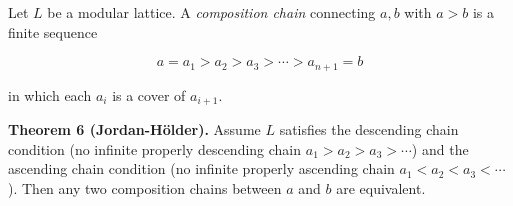 Let $L$ be a modular lattice. A \textit{composition chain} connecting $a, b$ with $a > b$ is a finite sequence

$$a = a_1 > a_2 > a_3 > \cdots > a_{n+1} = b$$

in which each $a_i$ is a cover of $a_{i+1}$.

\textbf{Theorem 6 (Jordan-Hölder).} Assume $L$ satisfies the descending chain condition (no infinite properly descending chain $a_1 > a_2 > a_3 > \cdots$) and the ascending chain condition (no infinite properly ascending chain $a_1 < a_2 < a_3 < \cdots$). Then any two composition chains between $a$ and $b$ are equivalent.
